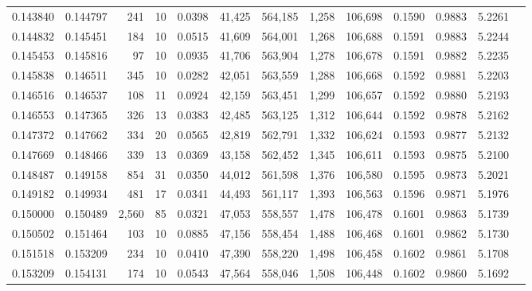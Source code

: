 \begin{tabular}{rrrrrrrrrrrrr}
0.143840 & 0.144797 &   241 &  10 &                                     0.0398 &  41,425 & 564,185 &   1,258 & 106,698 & 0.1590 & 0.9883 & 5.2261 \\
0.144832 & 0.145451 &   184 &  10 &                                     0.0515 &  41,609 & 564,001 &   1,268 & 106,688 & 0.1591 & 0.9883 & 5.2244 \\
0.145453 & 0.145816 &    97 &  10 &                                     0.0935 &  41,706 & 563,904 &   1,278 & 106,678 & 0.1591 & 0.9882 & 5.2235 \\
0.145838 & 0.146511 &   345 &  10 &                                     0.0282 &  42,051 & 563,559 &   1,288 & 106,668 & 0.1592 & 0.9881 & 5.2203 \\
0.146516 & 0.146537 &   108 &  11 &                                     0.0924 &  42,159 & 563,451 &   1,299 & 106,657 & 0.1592 & 0.9880 & 5.2193 \\
0.146553 & 0.147365 &   326 &  13 &                                     0.0383 &  42,485 & 563,125 &   1,312 & 106,644 & 0.1592 & 0.9878 & 5.2162 \\
0.147372 & 0.147662 &   334 &  20 &                                     0.0565 &  42,819 & 562,791 &   1,332 & 106,624 & 0.1593 & 0.9877 & 5.2132 \\
0.147669 & 0.148466 &   339 &  13 &                                     0.0369 &  43,158 & 562,452 &   1,345 & 106,611 & 0.1593 & 0.9875 & 5.2100 \\
0.148487 & 0.149158 &   854 &  31 &                                     0.0350 &  44,012 & 561,598 &   1,376 & 106,580 & 0.1595 & 0.9873 & 5.2021 \\
0.149182 & 0.149934 &   481 &  17 &                                     0.0341 &  44,493 & 561,117 &   1,393 & 106,563 & 0.1596 & 0.9871 & 5.1976 \\
0.150000 & 0.150489 & 2,560 &  85 &                                     0.0321 &  47,053 & 558,557 &   1,478 & 106,478 & 0.1601 & 0.9863 & 5.1739 \\
0.150502 & 0.151464 &   103 &  10 &                                     0.0885 &  47,156 & 558,454 &   1,488 & 106,468 & 0.1601 & 0.9862 & 5.1730 \\
0.151518 & 0.153209 &   234 &  10 &                                     0.0410 &  47,390 & 558,220 &   1,498 & 106,458 & 0.1602 & 0.9861 & 5.1708 \\
0.153209 & 0.154131 &   174 &  10 &                                     0.0543 &  47,564 & 558,046 &   1,508 & 106,448 & 0.1602 & 0.9860 & 5.1692 \\

\end{tabular}
